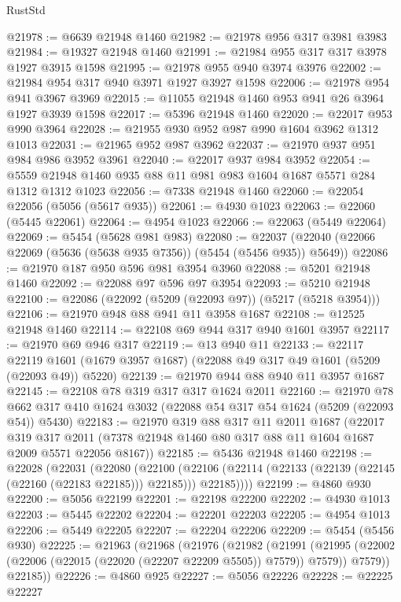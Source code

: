 \begin{lexlean}{RustStd}
\begin{coremodule}
@21978 := @6639 @21948 @1460
@21982 := @21978 @956 @317 @3981 @3983
@21984 := @19327 @21948 @1460
@21991 := @21984 @955 @317 @317 @3978 @1927 @3915 @1598
@21995 := @21978 @955 @940 @3974 @3976
@22002 := @21984 @954 @317 @940 @3971 @1927 @3927 @1598
@22006 := @21978 @954 @941 @3967 @3969
@22015 := @11055 @21948 @1460 @953 @941 @26 @3964 @1927 @3939 @1598
@22017 := @5396 @21948 @1460
@22020 := @22017 @953 @990 @3964
@22028 := @21955 @930 @952 @987 @990 @1604 @3962 @1312 @1013
@22031 := @21965 @952 @987 @3962
@22037 := @21970 @937 @951 @984 @986 @3952 @3961
@22040 := @22017 @937 @984 @3952
@22054 := @5559 @21948 @1460 @935 @88 @11 @981 @983 @1604 @1687 @5571 @284 @1312 @1312 @1023
@22056 := @7338 @21948 @1460
@22060 := @22054 @22056 (@5056 (@5617 @935))
@22061 := @4930 @1023
@22063 := @22060 (@5445 @22061)
@22064 := @4954 @1023
@22066 := @22063 (@5449 @22064)
@22069 := @5454 (@5628 @981 @983)
@22080 := @22037 (@22040 (@22066 @22069 (@5636 (@5638 @935 @7356)) (@5454 (@5456 @935)) @5649))
@22086 := @21970 @187 @950 @596 @981 @3954 @3960
@22088 := @5201 @21948 @1460
@22092 := @22088 @97 @596 @97 @3954
@22093 := @5210 @21948
@22100 := @22086 (@22092 (@5209 (@22093 @97)) (@5217 (@5218 @3954)))
@22106 := @21970 @948 @88 @941 @11 @3958 @1687
@22108 := @12525 @21948 @1460
@22114 := @22108 @69 @944 @317 @940 @1601 @3957
@22117 := @21970 @69 @946 @317
@22119 := @13 @940 @11
@22133 := @22117
    @22119
    @1601
    (@1679 @3957 @1687)
    (@22088 @49 @317 @49 @1601 (@5209 (@22093 @49)) @5220)
@22139 := @21970 @944 @88 @940 @11 @3957 @1687
@22145 := @22108 @78 @319 @317 @317 @1624 @2011
@22160 := @21970
    @78
    @662
    @317
    @410
    @1624
    @3032
    (@22088 @54 @317 @54 @1624 (@5209 (@22093 @54)) @5430)
@22183 := @21970
    @319
    @88
    @317
    @11
    @2011
    @1687
    (@22017
      @319
      @317
      @2011
      (@7378 @21948 @1460 @80 @317 @88 @11 @1604 @1687 @2009 @5571 @22056 @8167))
@22185 := @5436 @21948 @1460
@22198 := @22028
    (@22031
      (@22080
        (@22100
          (@22106 (@22114 (@22133 (@22139 (@22145 (@22160 (@22183 @22185))) @22185))) @22185))))
@22199 := @4860 @930
@22200 := @5056 @22199
@22201 := @22198 @22200
@22202 := @4930 @1013
@22203 := @5445 @22202
@22204 := @22201 @22203
@22205 := @4954 @1013
@22206 := @5449 @22205
@22207 := @22204 @22206
@22209 := @5454 (@5456 @930)
@22225 := @21963
    (@21968
      (@21976
        (@21982
          (@21991
            (@21995 (@22002 (@22006 (@22015 (@22020 (@22207 @22209 @5505)) @7579)) @7579))
            @7579))
        @22185))
@22226 := @4860 @925
@22227 := @5056 @22226
@22228 := @22225 @22227

\end{coremodule}
\end{lexlean}
